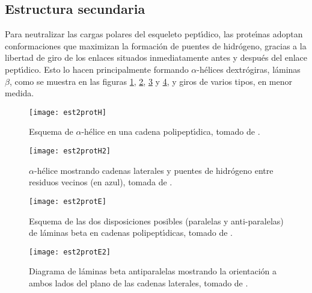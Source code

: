 \subsection{Estructura secundaria} \label{SS}

Para neutralizar las cargas polares del esqueleto pept\'\i{}dico, las prote\'\i{}nas adoptan conformaciones
que maximizan la formaci\'{o}n de puentes de hidr\'{o}geno, gracias a la libertad de giro de los enlaces situados 
inmediatamente antes y despu\'{e}s del enlace pept\'\i{}dico. Esto lo hacen principalmente formando \(\alpha\)-h\'{e}lices 
dextr\'{o}giras, l\'{a}minas \(\beta\), como se muestra en las figuras \ref{fig:est2protH}, \ref{fig:est2protH2}, \ref{fig:est2protE} y 
\ref{fig:est2protE2}, y  giros de varios tipos, en menor medida.

\begin{figure}
\begin{center} 
\texttt{[image: est2protH]}
\caption%
{
Esquema de $\alpha$-h\'{e}lice en una cadena polipept\'\i{}dica,
tomado de .
}
\label{fig:est2protH}
\end{center}
\end{figure}

\begin{figure}
\begin{center} 
\texttt{[image: est2protH2]}
\caption%
{
$\alpha$-h\'{e}lice mostrando cadenas laterales y puentes de hidr\'{o}geno entre residuos vecinos (en azul),
tomada de .
}
\label{fig:est2protH2}
\end{center}
\end{figure}

\begin{figure}
\begin{center} 
\texttt{[image: est2protE]}
\caption%
{
Esquema de las dos disposiciones posibles (paralelas y anti-paralelas) de l\'{a}minas beta en cadenas polipept\'\i{}dicas,
tomado de .
}
\label{fig:est2protE}
\end{center}
\end{figure}

\begin{figure}
\begin{center} 
\texttt{[image: est2protE2]}
\caption%
{
Diagrama de l\'{a}minas beta antiparalelas mostrando la orientaci\'{o}n a ambos lados del plano de las cadenas laterales,
tomado de .
}
\label{fig:est2protE2}
\end{center}
\end{figure}

